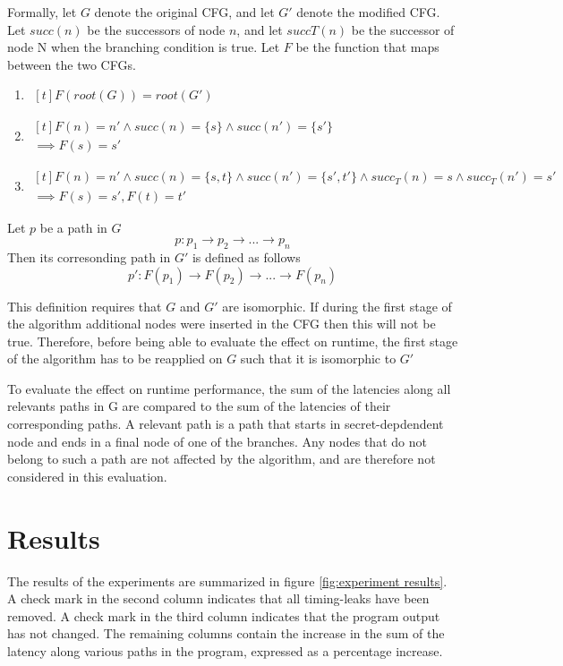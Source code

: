 Formally, let $G$ denote the original CFG, and let $G'$ denote the modified CFG. Let $succ(n)$ be the successors of node $n$, and let $succT(n)$ be 
the successor of node N when the branching condition is true. Let $F$ be the function that maps between the two CFGs.  
\begin{enumerate}
    \item $\begin{aligned}[t]
    F(root(G)) = root(G')
\end{aligned}$
\item $\begin{aligned}[t]
    F(n) = n' \land succ(n) = \{s\} \land succ(n')=\{s'\} \\ 
    \implies F(s)=s'
\end{aligned}$
\item $\begin{aligned}[t]
    F(n) = n' \land succ(n) = \{s, t\} \land succ(n')=\{s', t'\} \land succ_T(n)=s \land succ_T(n') = s'\\
    \implies F(s)=s', F(t) = t'
\end{aligned}$
\end{enumerate}
Let $p$ be a path in $G$
$$ p: p_1 \rightarrow p_2 \rightarrow ... \rightarrow p_n$$
Then its corresonding path in $G'$ is defined as follows 
$$ p': F(p_1) \rightarrow F(p_2) \rightarrow ... \rightarrow F(p_n)$$

This definition requires that $G$ and $G'$ are isomorphic. If during the first stage of the algorithm additional nodes were inserted in the CFG
then this will not be true. Therefore, before being able to evaluate the effect on runtime, the first stage of the algorithm has to be reapplied on $G$ such 
that it is isomorphic to $G'$

To evaluate the effect on runtime performance, the sum of the latencies along all relevants paths in G are compared to the sum of the latencies of their corresponding paths. A relevant path is a path that starts in secret-depdendent node and ends in a final node of one of the branches. Any nodes that do not belong to such a path 
are not affected by the algorithm, and are therefore not considered in this evaluation. 

    
\section{Results}
\label{sec:results}
The results of the experiments are summarized in figure \ref{fig:experiment results}.
A check mark in the second column indicates that all timing-leaks have been removed. 
A check mark in the third column indicates that the program output has not changed. 
The remaining columns contain the increase in the sum of the latency along various paths in the program, expressed as a percentage increase.

